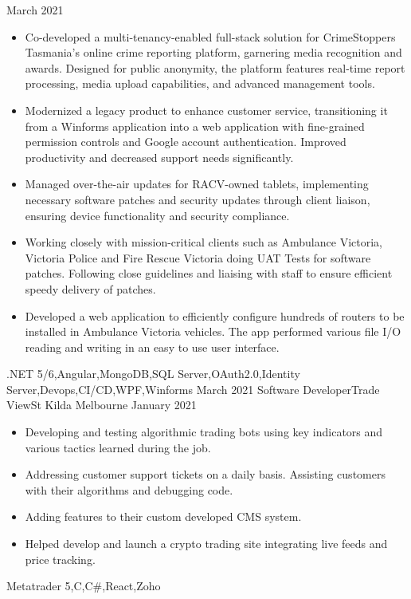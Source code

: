 \begin{experiences}
    {March 2021}    {
                      \begin{itemize}
                        \item Co-developed a multi-tenancy-enabled full-stack solution for CrimeStoppers Tasmania's online crime reporting platform, garnering media recognition and awards. Designed for public anonymity, the platform features real-time report processing, media upload capabilities, and advanced management tools.
                        \item Modernized a legacy product to enhance customer service, transitioning it from a Winforms application into a web application with fine-grained permission controls and Google account authentication. Improved productivity and decreased support needs significantly.
                        \item Managed over-the-air updates for RACV-owned tablets, implementing necessary software patches and security updates through client liaison, ensuring device functionality and security compliance.
                        \item Working closely with mission-critical clients such as Ambulance Victoria, Victoria Police and Fire Rescue Victoria doing UAT Tests for software patches. Following close guidelines and liaising with staff to ensure efficient speedy delivery of patches.
                        \item Developed a web application to efficiently configure hundreds of routers to be installed in Ambulance Victoria vehicles. The app performed various file I/O reading and writing in an easy to use user interface.
                      \end{itemize}
                    }
                    {.NET 5/6,Angular,MongoDB,SQL Server,OAuth2.0,Identity Server,Devops,CI/CD,WPF,Winforms}
  \emptySeparator
  \experience
    {March 2021}     {Software Developer}{Trade View}{St Kilda Melbourne}
    {January 2021}    {
                      \begin{itemize}
                        \item Developing and testing algorithmic trading bots using key indicators and various tactics learned during the job.
                        \item Addressing customer support tickets on a daily basis. Assisting customers with their algorithms and debugging code.
                        \item Adding features to their custom developed CMS system.
                        \item Helped develop and launch a crypto trading site integrating live feeds and price tracking. 
                      \end{itemize}
                    }
                    {Metatrader 5,C,C\#,React,Zoho}
  \emptySeparator
\end{experiences}
